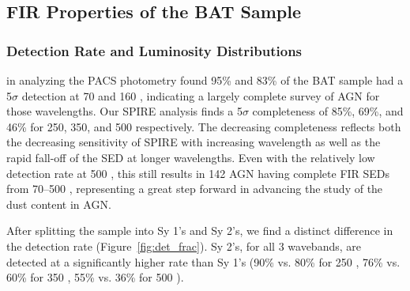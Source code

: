 \subsection{FIR Properties of the BAT Sample }
\subsubsection{Detection Rate and Luminosity Distributions}
\citet{Melendez:2014yu} in analyzing the PACS photometry found 95\% and 83\% of the BAT sample had a 5$\sigma$ detection at 70 and 160 \micron, indicating a largely complete survey of AGN for those wavelengths. Our SPIRE analysis finds a 5$\sigma$ completeness of 85\%, 69\%, and 46\% for 250, 350, and 500 \micron{} respectively. The decreasing completeness reflects both the decreasing sensitivity of SPIRE with increasing wavelength as well as the rapid fall-off of the SED at longer wavelengths. Even with the relatively low detection rate at 500 \micron{}, this still results in 142 AGN having complete FIR SEDs from 70--500 \um, representing a great step forward in advancing the study of the dust content in AGN. 

After splitting the sample into Sy 1's and Sy 2's, we find a distinct difference in the detection rate (Figure~\ref{fig:det_frac}). Sy 2's, for all 3 wavebands, are detected at a significantly higher rate than Sy 1's (90\% vs. 80\% for 250 \um, 76\% vs. 60\% for 350 \um, 55\% vs. 36\% for 500 \um).